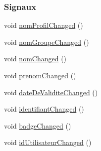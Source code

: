 \subsubsection*{Signaux}
\begin{DoxyCompactItemize}
\item 
void \hyperlink{class_utilisateur_armoire_a1865caa46abf205eee696e7dae10ada7}{nom\+Profil\+Changed} ()
\item 
void \hyperlink{class_utilisateur_armoire_a8d7b24df07749d32b302b62f63597bc1}{nom\+Groupe\+Changed} ()
\item 
void \hyperlink{class_utilisateur_armoire_a3e33ff50b8510ea1ed407c65480c4c53}{nom\+Changed} ()
\item 
void \hyperlink{class_utilisateur_armoire_a23d33045d124908744df512f30068d47}{prenom\+Changed} ()
\item 
void \hyperlink{class_utilisateur_armoire_afabd9e9078f2c640b4d500b9e112bc97}{date\+De\+Validite\+Changed} ()
\item 
void \hyperlink{class_utilisateur_armoire_a8d849ded67b0be0d0af52da8cc514b1d}{identifiant\+Changed} ()
\item 
void \hyperlink{class_utilisateur_armoire_a1f4398193c7280be20758f0341ab303e}{badge\+Changed} ()
\item 
void \hyperlink{class_utilisateur_armoire_a7ec1ac0b2496562bb1016339ba24f346}{id\+Utilisateur\+Changed} ()
\end{DoxyCompactItemize}
